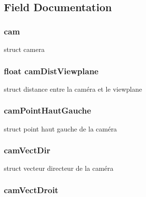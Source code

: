 \subsection{Field Documentation}
\hypertarget{structcamera__new_a16ecffc15a7a4163203346c420ba58f6}{
\subsubsection[{cam}]{ {\bf cam}}}
\label{structcamera__new_a16ecffc15a7a4163203346c420ba58f6}
struct camera \hypertarget{structcamera__new_a3ae08eef6550dcb69bb2b49bc0dc8f63}{
\subsubsection[{camDistViewplane}]{\setlength{\rightskip}{0pt plus 5cm}float {\bf camDistViewplane}}}
\label{structcamera__new_a3ae08eef6550dcb69bb2b49bc0dc8f63}
struct distance entre la caméra et le viewplane \hypertarget{structcamera__new_ae73d110605e87ba94ec370139f28651a}{
\subsubsection[{camPointHautGauche}]{ {\bf camPointHautGauche}}}
\label{structcamera__new_ae73d110605e87ba94ec370139f28651a}
struct point haut gauche de la caméra \hypertarget{structcamera__new_a6873067a7702a2c4824cb85694036163}{
\subsubsection[{camVectDir}]{ {\bf camVectDir}}}
\label{structcamera__new_a6873067a7702a2c4824cb85694036163}
struct vecteur directeur de la caméra \hypertarget{structcamera__new_ab3a4002e1ae75a9133367b3dda70ee14}{
\subsubsection[{camVectDroit}]{ {\bf camVectDroit}}}
